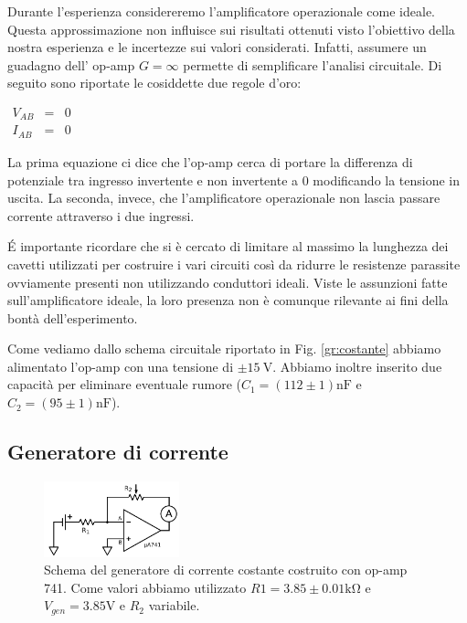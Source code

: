 Durante l'esperienza considereremo l'amplificatore operazionale come ideale. Questa approssimazione non influisce sui risultati ottenuti visto l'obiettivo della nostra esperienza e le incertezze sui valori considerati. Infatti, assumere un guadagno dell' op-amp $G=\infty$ permette di semplificare l'analisi circuitale. Di seguito sono riportate le cosiddette due regole d'oro:


$\begin{array}{lcl} V_{AB} & = & 0 \\ I_{AB} & = & 0 \end{array}$


La prima equazione ci dice che l'op-amp cerca di portare la differenza di potenziale tra ingresso invertente e non invertente a $0$ modificando la tensione in uscita. La seconda, invece, che l'amplificatore operazionale non lascia passare corrente attraverso i due ingressi.

\'E importante ricordare che si è cercato di limitare al massimo la lunghezza dei cavetti utilizzati per costruire i vari circuiti così da ridurre le resistenze parassite ovviamente presenti non utilizzando conduttori ideali. Viste le assunzioni fatte sull'amplificatore ideale, la loro presenza non è comunque rilevante ai fini della bontà dell'esperimento.




Come vediamo dallo schema circuitale riportato in Fig. \ref{gr:costante} abbiamo alimentato l'op-amp con una tensione di $\pm \SI{15}{\volt}$. Abbiamo inoltre inserito due capacità per eliminare eventuale rumore ($C_1=(112 \pm 1)\si{\nano\farad}$ e $C_2=(95\pm 1)\si{\nano\farad}$).

\subsection{Generatore di corrente}


\begin{figure}
  \begin{center}
    \includegraphics[width=0.35\textwidth]{../E01/latex/c1.pdf}
  \end{center}
  \caption{Schema del generatore di corrente costante costruito con op-amp 741. Come valori abbiamo utilizzato $R1=3.85 \pm 0.01 \si{\kilo\ohm}$ e $V_{gen}=3.85 \si{\volt}$ e $R_2$ variabile.}
\end{figure}

